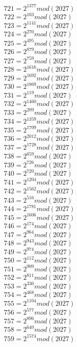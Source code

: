 \documentclass[12pt, letterpaper]{article}
\begin{document}
\begin{itemize}
\begin{multicols}{3}
$721= 2^{1377} mod (2027)$\\
$722= 2^{103} mod (2027)$\\
$723= 2^{1141} mod (2027)$\\
$724= 2^{270} mod (2027)$\\
$725= 2^{495} mod (2027)$\\
$726= 2^{879} mod (2027)$\\
$727= 2^{759} mod (2027)$\\
$728= 2^{1616} mod (2027)$\\
$729= 2^{1692} mod (2027)$\\
$730= 2^{1869} mod (2027)$\\
$731= 2^{119} mod (2027)$\\
$732= 2^{1460} mod (2027)$\\
$733= 2^{209} mod (2027)$\\
$734= 2^{1359} mod (2027)$\\
$735= 2^{1709} mod (2027)$\\
$736= 2^{2012} mod (2027)$\\
$737= 2^{1728} mod (2027)$\\
$738= 2^{659} mod (2027)$\\
$739= 2^{726} mod (2027)$\\
$740= 2^{720} mod (2027)$\\
$741= 2^{1204} mod (2027)$\\
$742= 2^{1562} mod (2027)$\\
$743= 2^{516} mod (2027)$\\
$744= 2^{1781} mod (2027)$\\
$745= 2^{1606} mod (2027)$\\
$746= 2^{174} mod (2027)$\\
$747= 2^{964} mod (2027)$\\
$748= 2^{943} mod (2027)$\\
$749= 2^{974} mod (2027)$\\
$750= 2^{112} mod (2027)$\\
$751= 2^{909} mod (2027)$\\
$752= 2^{811} mod (2027)$\\
$753= 2^{330} mod (2027)$\\
$754= 2^{468} mod (2027)$\\
$755= 2^{1104} mod (2027)$\\
$756= 2^{577} mod (2027)$\\
$757= 2^{896} mod (2027)$\\
$758= 2^{640} mod (2027)$\\
$759= 2^{1574} mod (2027)$\\

\end{multicols}
\end{itemize}
\end{document}
